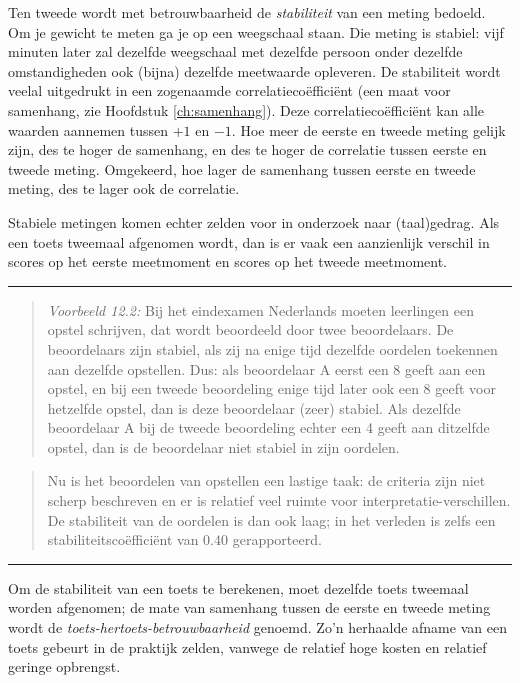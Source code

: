 \documentclass[
]{book}
\begin{document}
Ten tweede wordt met betrouwbaarheid de \emph{stabiliteit} van een meting
bedoeld. Om je gewicht te meten ga je op een weegschaal staan. Die
meting is stabiel: vijf minuten later zal dezelfde weegschaal met
dezelfde persoon onder dezelfde omstandigheden ook (bijna) dezelfde meetwaarde
opleveren. De stabiliteit wordt veelal uitgedrukt in een zogenaamde
correlatiecoëfficiënt (een maat voor samenhang, zie Hoofdstuk
\ref{ch:samenhang}). Deze correlatiecoëfficiënt kan alle waarden
aannemen tussen \(+1\) en \(-1\). Hoe meer de eerste en tweede meting gelijk
zijn, des te hoger de samenhang, en des te hoger de correlatie tussen
eerste en tweede meting. Omgekeerd, hoe lager de samenhang tussen eerste
en tweede meting, des te lager ook de correlatie.

Stabiele metingen komen echter zelden voor in onderzoek naar
(taal)gedrag. Als een toets tweemaal afgenomen wordt, dan is er vaak een
aanzienlijk verschil in scores op het eerste meetmoment en scores op het
tweede meetmoment.

\begin{center}\rule{0.5\linewidth}{0.5pt}\end{center}

\begin{quote}
\emph{Voorbeeld 12.2:}
Bij het eindexamen Nederlands moeten leerlingen een opstel schrijven,
dat wordt beoordeeld door twee beoordelaars. De beoordelaars zijn
stabiel, als zij na enige tijd dezelfde oordelen toekennen aan dezelfde
opstellen. Dus: als beoordelaar A eerst een 8 geeft aan een opstel, en
bij een tweede beoordeling enige tijd later ook een 8 geeft voor
hetzelfde opstel, dan is deze beoordelaar (zeer) stabiel. Als dezelfde
beoordelaar A bij de tweede beoordeling echter een 4 geeft aan ditzelfde
opstel, dan is de beoordelaar niet stabiel in zijn oordelen.
\end{quote}

\begin{quote}
Nu is het beoordelen van opstellen een lastige taak: de criteria zijn
niet scherp beschreven en er is relatief veel ruimte voor
interpretatie-verschillen. De stabiliteit van de oordelen is dan ook
laag; in het verleden is zelfs een stabiliteitscoëfficiënt van \(0.40\)
gerapporteerd.
\end{quote}

\begin{center}\rule{0.5\linewidth}{0.5pt}\end{center}

Om de stabiliteit van een toets te berekenen, moet dezelfde toets
tweemaal worden afgenomen; de mate van samenhang tussen de eerste en
tweede meting wordt de \emph{toets-hertoets-betrouwbaarheid} genoemd. Zo'n
herhaalde afname van een toets gebeurt in de praktijk zelden, vanwege de
relatief hoge kosten en relatief geringe opbrengst.
\end{document}
